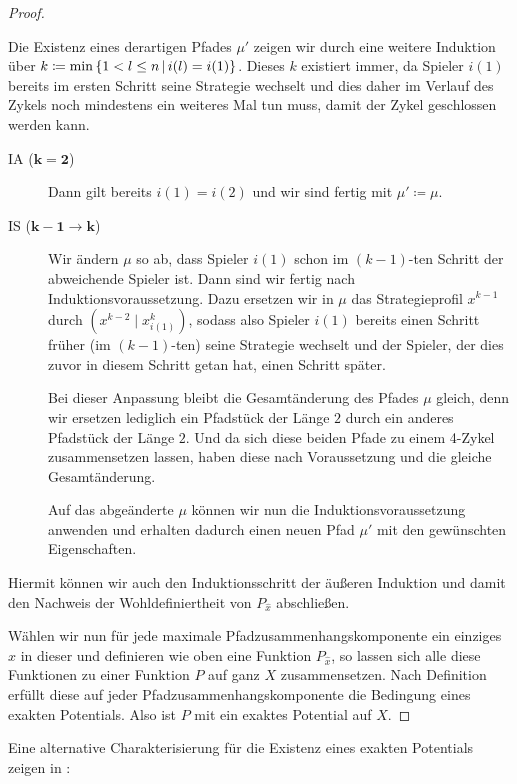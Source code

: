 \begin{proof}
\begin{description}
		Die Existenz eines derartigen Pfades $\mu'$ zeigen wir durch eine weitere Induktion über $k \coloneqq \min\left\{1 < l \leq n \,\middle|\, i(l) = i(1)\right\}$. Dieses $k$ existiert immer, da Spieler $i(1)$ bereits im ersten Schritt seine Strategie wechselt und dies daher im Verlauf des Zykels noch mindestens ein weiteres Mal tun muss, damit der Zykel geschlossen werden kann.
		\begin{description}
			\item[IA ($\bm{k=2}$)] Dann gilt bereits $i(1)=i(2)$ und wir sind fertig mit $\mu' \coloneqq \mu$.
			\item[IS ($\bm{k-1\to k}$)] Wir ändern $\mu$ so ab, dass Spieler $i(1)$ schon im $(k-1)$-ten Schritt der abweichende Spieler ist. Dann sind wir fertig nach Induktionsvoraussetzung. Dazu ersetzen wir in $\mu$ das Strategieprofil $x^{k-1}$ durch $(x^{k-2} \mid x^{k}_{i(1)})$, sodass also Spieler $i(1)$ bereits einen Schritt früher (im $(k-1)$-ten) seine Strategie wechselt und der Spieler, der dies zuvor in diesem Schritt getan hat, einen Schritt später.
			
			Bei dieser Anpassung bleibt die Gesamtänderung des Pfades $\mu$ gleich, denn wir ersetzen lediglich ein Pfadstück der Länge $2$ durch ein anderes Pfadstück der Länge $2$. Und da sich diese beiden Pfade zu einem 4-Zykel zusammensetzen lassen, haben diese nach Voraussetzung und  die gleiche Gesamtänderung.
			
			Auf das abgeänderte $\mu$ können wir nun die Induktionsvoraussetzung anwenden und erhalten dadurch einen neuen Pfad $\mu'$ mit den gewünschten Eigenschaften.
		\end{description}
		Hiermit können wir auch den Induktionsschritt der äußeren Induktion und damit den Nachweis der Wohldefiniertheit von $P_{\hat{x}}$ abschließen. 
	\end{description}	
	Wählen wir nun für jede maximale Pfadzusammenhangskomponente ein einziges $\hat{x}$ in dieser und definieren wie oben eine Funktion $P_{\hat{x}}$, so lassen sich alle diese Funktionen zu einer Funktion $P$ auf ganz $X$ zusammensetzen. Nach Definition erfüllt diese auf jeder Pfadzusammenhangskomponente die Bedingung eines exakten Potentials. Also ist $P$ mit  ein exaktes Potential auf $X$.
\end{proof}

Eine alternative Charakterisierung für die Existenz eines exakten Potentials zeigen \citeauthor{KoordDummy} in \cite[Theorem 2.1]{KoordDummy}:

